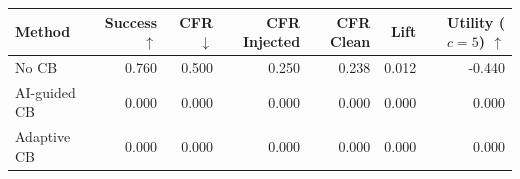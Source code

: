 \begin{tabular}{lrrrrrr}
\toprule
Method & Success $\uparrow$ & CFR $\downarrow$ & CFR Injected & CFR Clean & Lift & Utility ($c=5$) $\uparrow$ \\
\midrule
No CB & 0.760 & 0.500 & 0.250 & 0.238 & 0.012 & -0.440 \\
AI-guided CB & 0.000 & 0.000 & 0.000 & 0.000 & 0.000 & 0.000 \\
Adaptive CB & 0.000 & 0.000 & 0.000 & 0.000 & 0.000 & 0.000 \\
\bottomrule
\end{tabular}
